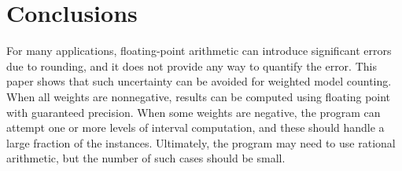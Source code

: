 \documentclass[letterpaper,USenglish,cleveref, autoref, thm-restate]{lipics-v2021}
\begin{document}


\section{Conclusions}
\label{sect:conclusion}

For many applications, floating-point arithmetic can introduce
significant errors due to rounding, and it does not provide any way to quantify the error.
This
paper shows that such uncertainty can be avoided for weighted model
counting.  When all weights are nonnegative, results can be computed
using floating point with guaranteed precision.  When some weights
are negative, the program can attempt one or more levels of interval
computation, and these should handle a large fraction of the instances.  Ultimately,
the program may need to use rational arithmetic, but the number
of such cases should be small.

\end{document}
